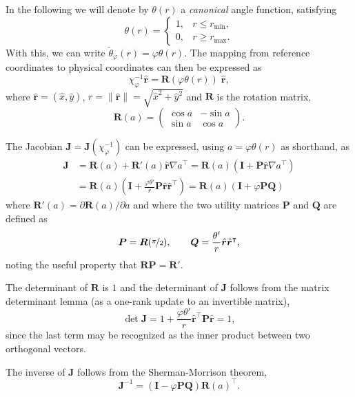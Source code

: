 \documentclass[onecolumn, twoside, a4paper, 11pt]{article}
\begin{document}
In the following we will denote by $\theta(r)$ a \emph{canonical} angle
function, satisfying
\[
  \theta(r) = \begin{cases}
    1, & r \le r_\text{min}, \\
    0, & r \ge r_\text{max}.
  \end{cases}
\]
With this, we can write $\tilde{\theta}_\varphi(r) = \varphi \theta(r)$.
The mapping from reference coordinates to physical coordinates can then be
expressed as
\[
  \chi_{\varphi}^{-1} \hat{\bm r}
  = \bm R(\varphi \theta(r)) \; \hat{\bm r},
\]
where $\hat{\bm r} = \left( \hat{x}, \hat{y} \right)$,
$r = \| \hat{\bm r} \| = \sqrt{\hat{x}^2 + \hat{y}^2}$
and $\bm R$ is the rotation matrix,
\[
  \bm R(a) = \begin{pmatrix} \cos a & - \sin a \\ \sin a & \cos a \end{pmatrix}.
\]

The Jacobian $\bm J = \bm J(\chi_{\varphi}^{-1})$ can be expressed,
using $a = \varphi \theta(r)$ as shorthand, as
\begin{align}
  \nonumber
  \bm J &= \bm R(a) + \bm R'(a) \hat{\bm r} \nabla a^\intercal
  = \bm R(a) \left( \bm I + \bm P \hat{\bm r} \nabla a^\intercal \right) \\
  &= \bm R(a) \left(
    \bm I + \frac{\varphi \theta'}{r} \bm P \hat{\bm r} \hat{\bm r}^\intercal
  \right)
  = \bm R(a) \left( \bm I + \varphi \bm P \bm Q \right)
\end{align}
where $\bm R'(a) = \partial \bm R(a) / \partial a$ and
where the two utility matrices $\bm P$ and $\bm Q$ are defined as
\begin{equation}
  \bm P = \bm R(\nicefrac{\pi}{2}), \qquad
  \bm Q = \frac{\theta'}{r} \hat{\bm r} \hat{\bm r}^\intercal,
\end{equation}
noting the useful property that $\bm R \bm P = \bm R'$.

The determinant of $\bm R$ is $1$ and the determinant of $\bm J$ follows
from the matrix determinant lemma (as a one-rank update to an invertible
matrix),
\[
  \det \bm J = 1 + \frac{\varphi\theta'}{r} \hat{\bm r}^\intercal \bm P \hat{\bm r} = 1,
\]
since the last term may be recognized as the inner product between two
orthogonal vectors.

The inverse of $\bm J$ follows from the Sherman-Morrison theorem,
\[
  \bm J^{-1} = \left( \bm I - \varphi \bm P \bm Q \right)
  \bm R(a)^\intercal.
\]
\end{document}
